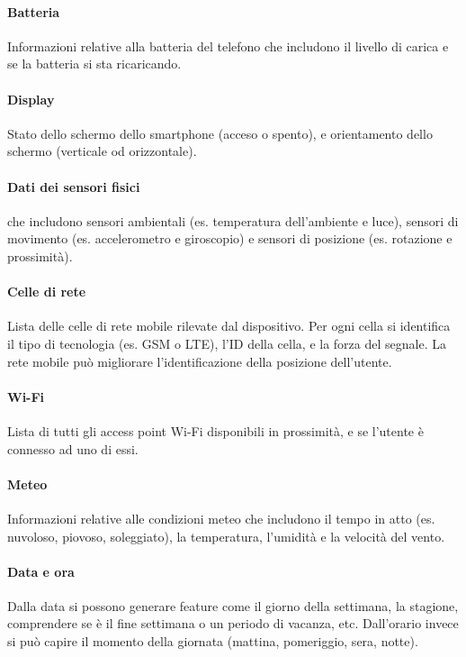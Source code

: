 \documentclass[12pt,italian]{report}
\begin{document}
\paragraph{Batteria} Informazioni relative alla batteria del telefono che includono il livello di carica e se la batteria si sta ricaricando. 

\paragraph{Display}  Stato dello schermo dello smartphone (acceso o spento), e orientamento dello schermo (verticale od orizzontale).

\paragraph{Dati dei sensori fisici} che includono sensori ambientali (es. temperatura dell'ambiente e luce), sensori di movimento (es. accelerometro e giroscopio) e sensori di posizione (es. rotazione e prossimità).

\paragraph{Celle di rete} Lista delle celle di rete mobile rilevate dal dispositivo. Per ogni cella si identifica il tipo di tecnologia (es. GSM o LTE), l'ID della cella, e la forza del segnale. La rete mobile può migliorare l'identificazione della posizione dell'utente.

\paragraph{Wi-Fi} Lista di tutti gli access point Wi-Fi disponibili in prossimità, e se l'utente è connesso ad uno di essi.

\paragraph{Meteo} Informazioni relative alle condizioni meteo che includono il tempo in atto (es. nuvoloso, piovoso, soleggiato), la temperatura, l'umidità e la velocità del vento.

\paragraph{Data e ora} Dalla data si possono generare feature come il giorno della settimana, la stagione, comprendere se è il fine settimana o un periodo di vacanza, etc. Dall'orario invece si può capire il momento della giornata (mattina, pomeriggio, sera, notte).
\end{document}
